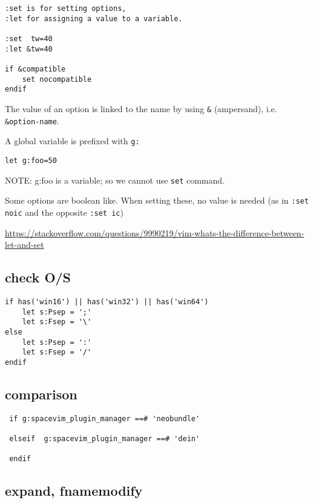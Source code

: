 \begin{verbatim}
:set is for setting options, 
:let for assigning a value to a variable.

:set  tw=40
:let &tw=40

if &compatible
	set nocompatible
endif
\end{verbatim}

The value of an option is linked to the name by using \verb!&! (ampersand), i.e.
\verb!&option-name!.

A global variable is prefixed with \verb!g:!
\begin{verbatim}
let g:foo=50
\end{verbatim}
NOTE: g:foo is a variable; so we cannot use \verb!set! command.

Some options are boolean like. When setting these, no value is needed (as in
\verb!:set noic! and the opposite \verb!:set ic!)

\url{https://stackoverflow.com/questions/9990219/vim-whats-the-difference-between-let-and-set}

\subsection{check O/S}
\label{sec:vim-script-if-statement}
\label{sec:vim-script-check-OS}

\begin{verbatim}
if has('win16') || has('win32') || has('win64')
    let s:Psep = ';'
    let s:Fsep = '\'
else
    let s:Psep = ':'
    let s:Fsep = '/'
endif
\end{verbatim}

\subsection{comparison}
\label{sec:vim-script-comparison}

\begin{verbatim}
 if g:spacevim_plugin_manager ==# 'neobundle'
 
 elseif  g:spacevim_plugin_manager ==# 'dein'
 
 endif
\end{verbatim}

\subsection{expand, fnamemodify}
\label{sec:vim-script-expand()}
\label{sec:vim-script-fnamemodify()}


